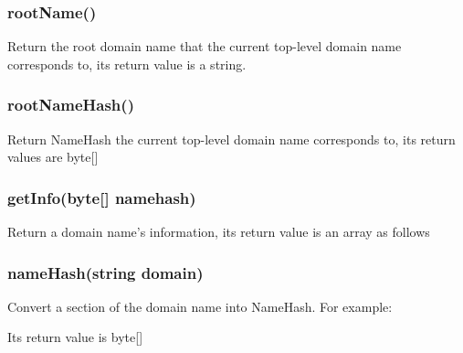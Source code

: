 \documentclass[letterpaper,10pt,english]{sphinxmanual}
\begin{document}
\subsubsection{rootName()}
\label{\detokenize{nns_protocol:rootname}}
Return the root domain name that the current top-level domain name corresponds to, its return value is a string.


\subsubsection{rootNameHash()}
\label{\detokenize{nns_protocol:rootnamehash}}
Return NameHash the current top-level domain name corresponds to, its return values are byte{[}{]}


\subsubsection{getInfo(byte{[}{]} namehash)}
\label{\detokenize{nns_protocol:getinfo-byte-namehash}}
Return a domain name’s information, its return value is an array as follows

%
\begin{sphinxVerbatim}[commandchars=\\\{\}]
\PYG{p}{[}
    \PYG{p}{[}\PYG{p}{]} 
    \PYG{p}{[}\PYG{p}{]} 
    \PYG{p}{[}\PYG{p}{]} 
     
\PYG{p}{]}
\end{sphinxVerbatim}


\subsubsection{nameHash(string domain)}
\label{\detokenize{nns_protocol:namehash-string-domain}}
Convert a section of the domain name into NameHash. For example:

%
\begin{sphinxVerbatim}[commandchars=\\\{\}]
\end{sphinxVerbatim}

Its return value is byte{[}{]}
\end{document}
